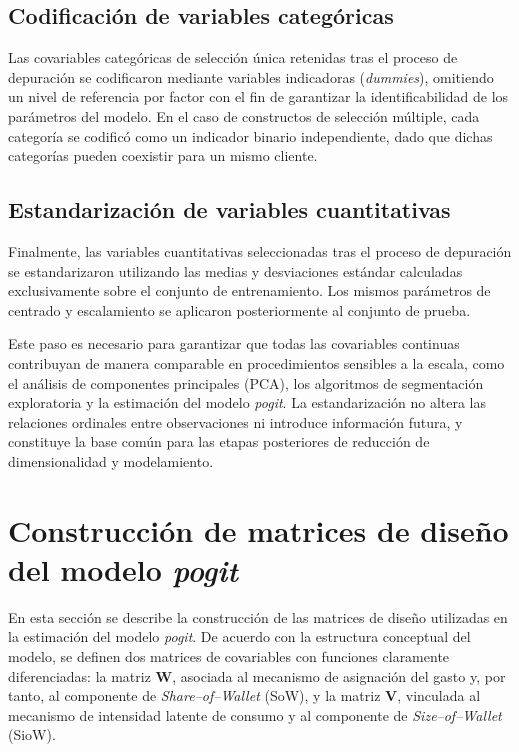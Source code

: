 \subsection{Codificación de variables categóricas}

    Las covariables categóricas de selección única retenidas tras el proceso de depuración se codificaron mediante variables indicadoras (\emph{dummies}), omitiendo un nivel de referencia por factor con el fin de garantizar la identificabilidad de los parámetros del modelo. En el caso de constructos de selección múltiple, cada categoría se codificó como un indicador binario independiente, dado que dichas categorías pueden coexistir para un mismo cliente.

\subsection{Estandarización de variables cuantitativas}

    Finalmente, las variables cuantitativas seleccionadas tras el proceso de depuración se estandarizaron utilizando las medias y desviaciones estándar calculadas exclusivamente sobre el conjunto de entrenamiento. Los mismos parámetros de centrado y escalamiento se aplicaron posteriormente al conjunto de prueba.
    
    Este paso es necesario para garantizar que todas las covariables continuas contribuyan de manera comparable en procedimientos sensibles a la escala, como el análisis de componentes principales (PCA), los algoritmos de segmentación exploratoria y la estimación del modelo \emph{pogit}. La estandarización no altera las relaciones ordinales entre observaciones ni introduce información futura, y constituye la base común para las etapas posteriores de reducción de dimensionalidad y modelamiento.

\section{Construcción de matrices de diseño del modelo \emph{pogit}}

    En esta sección se describe la construcción de las matrices de diseño utilizadas en la estimación del modelo \emph{pogit}. De acuerdo con la estructura conceptual del modelo, se definen dos matrices de covariables con funciones claramente diferenciadas: la matriz $\mathbf{W}$, asociada al mecanismo de asignación del gasto y, por tanto, al componente de \emph{Share--of--Wallet} (SoW), y la matriz $\mathbf{V}$, vinculada al mecanismo de intensidad latente de consumo y al componente de \emph{Size--of--Wallet} (SioW).
    
